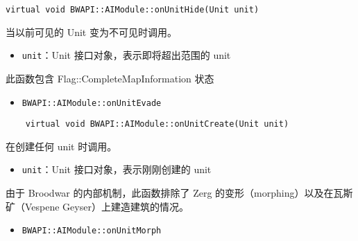 \begin{tcolorbox}[colback=white, colframe=black!60!white, title=onUnitHide(), arc=0mm]
\begin{verbatim}
virtual void BWAPI::AIModule::onUnitHide(Unit unit)
\end{verbatim}
当以前可见的 Unit 变为不可见时调用。
\begin{parameter}
    \begin{itemize}
        \item \texttt{unit}：Unit 接口对象，表示即将超出范围的 unit
    \end{itemize}
\end{parameter}
\begin{note}
    此函数包含 Flag::CompleteMapInformation 状态
\end{note}
\begin{refer}
    \begin{itemize}
        \item \texttt{BWAPI::AIModule::onUnitEvade}
    \end{itemize}
\end{refer}
\end{tcolorbox}
\begin{tcolorbox}[colback=white, colframe=black!60!white, title=onUnitCreate(), arc=0mm]
    \begin{verbatim}
    virtual void BWAPI::AIModule::onUnitCreate(Unit unit)
    \end{verbatim}
    在创建任何 unit 时调用。
    \begin{parameter}
        \begin{itemize}
            \item \texttt{unit}：Unit 接口对象，表示刚刚创建的 unit
        \end{itemize}
    \end{parameter}
    \begin{note}
        由于 Broodwar 的内部机制，此函数排除了 Zerg 的变形（morphing）以及在瓦斯矿（Vespene Geyser）上建造建筑的情况。
    \end{note}
    \begin{refer}
        \begin{itemize}
            \item \texttt{BWAPI::AIModule::onUnitMorph}
        \end{itemize}
    \end{refer}
\end{tcolorbox}


